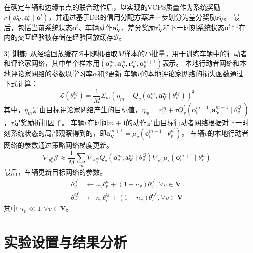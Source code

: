 在确定车辆和边缘节点的联合动作后，以实现的VCPS质量作为系统奖励$r\left(\boldsymbol{a}_{\mathbf{V}}^{t},\boldsymbol{a}_{e}^{t} \mid \boldsymbol{o}^{t}\right)$，并通过基于DR的信用分配方案进一步划分为差分奖励$\boldsymbol{r}_{\mathbf{V}}^{t}$。
最后，包括当前系统状态$\boldsymbol{o}^{t}$、车辆动作$\boldsymbol{a}_{\mathbf{V}}^{t}$、差分奖励$\boldsymbol{r}_{\mathbf{V}}^{t}$和下一时刻系统状态$\boldsymbol{o}^{t+1}$在内的交互经验被存储在经验回放缓存$\mathcal{B}$。

3) \textbf{训练}: 从经验回放缓存$\mathcal{B}$中随机抽取$M$样本的小批量，用于训练车辆中的行动者和评论家网络，其中单个样本用$(\boldsymbol{o}_{v}^{m}, \boldsymbol{a}_{\mathbf{V}}^{m}, \boldsymbol{r}_{\mathbf{V}}^{m}, \boldsymbol{o}_{v}^{m+1})$表示。
本地行动者网络和本地评论家网络的参数以学习率$\alpha$和$\beta$更新
车辆$v$的本地评论家网络的损失函数通过下式计算：
\begin{equation}
	\mathcal{L}\left(\theta_{v}^{Q}\right)=\frac{1}{M} \Sigma_{m}\left(\eta_{m}-Q_{v}\left(\boldsymbol{o}_{v}^{m}, \boldsymbol{a}_{\mathbf{V}}^{m} \mid \theta_{v}^{Q}\right)\right)^{2}
\end{equation}
\noindent 其中，$\eta_{m}$是由目标评论家网络产生的目标值，$\eta_{m}=r_{v}^{m}+\tau Q_{v}^{\prime}(\boldsymbol{o}_{v}^{m+1}, \boldsymbol{a}_{\mathbf{V}}^{m+1} \mid \theta_{v}^{Q^{\prime}})$，$\tau$是奖励折扣因子。
车辆$v$在时间$m+1$的动作是由目标行动者网络根据对下一时刻系统状态的局部观察得到的，即$\boldsymbol{a}_{\mathbf{V}}^{m+1}=\mu_{v}^{\prime}(\boldsymbol{o}_{v}^{m+1} \mid \theta_{v}^{\mu^{\prime}})$。
车辆$v$的本地行动者网络的参数通过策略网络梯度更新。
\begin{equation}
	\nabla_{\theta_{v}^{\mu}} \mathcal{J} \approx \frac{1}{M} \sum_{m} \nabla_{\boldsymbol{a}_{\mathbf{V}}^{m}} Q_{v}\left(\boldsymbol{o}_{v}^{m}, \boldsymbol{a}_{\mathbf{V}}^{m} \mid \theta_{v}^{Q}\right) \nabla_{\theta_{v}^{\mu}} \mu_{v}\left(\boldsymbol{o}_{v}^{m+1} \mid \theta_{v}^{\mu}\right)
\end{equation}
最后，车辆更新目标网络的参数。
\begin{align}
	\theta_{v}^{\mu^{\prime}} &\leftarrow n_{v} \theta_{v}^{\mu}+(1-n_{v})  \theta_{v}^{\mu^{\prime}}, \forall v \in \mathbf{V}\\
	\theta_{v}^{Q^{\prime}} &\leftarrow n_{v} \theta_{i}^{Q}+(1-n_{v})  \theta_{v}^{Q^{\prime}}, \forall v \in \mathbf{V}
\end{align}
\noindent 其中 $n_{v} \ll 1, \forall v \in \mathbf{V} $。

\section[\hspace{-2pt}实验设置与结果分析]{{ \hspace{-8pt}实验设置与结果分析}}\label{section 2-6}

